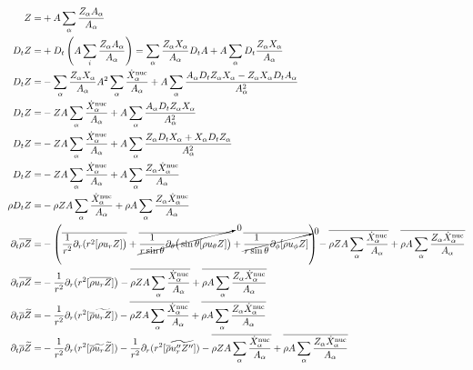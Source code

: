 \documentclass[10pt,paper=a4]{report}
\newcommand{\eht}{\overline}
\newcommand{\fht}{\widetilde}
\begin{document}
\begin{align}
Z = & + A \sum_\alpha \frac{Z_\alpha A_\alpha}{A_\alpha} \\
D_t Z = & +D_t \left(A \sum_i \frac{Z_\alpha A_\alpha}{A_\alpha}\right) = \sum_\alpha \frac{Z_\alpha X_\alpha}{A_\alpha} D_t A + A\sum_\alpha D_t \frac{Z_\alpha X_\alpha}{A_\alpha} \\
D_t Z = & -\sum_\alpha \frac{Z_\alpha X_\alpha}{A_\alpha}  A^2 \sum_\alpha \frac{\dot{X}_\alpha^{\rm nuc}}{A_\alpha} + A\sum_\alpha \frac{A_\alpha D_t Z_\alpha X_\alpha - Z_\alpha X_\alpha D_t A_\alpha}{A_\alpha^2} \\
D_t Z = & -Z A \sum_\alpha \frac{\dot{X}_\alpha^{\rm nuc}}{A_\alpha} + A \sum_\alpha \frac{A_\alpha D_t Z_\alpha X_\alpha}{A_\alpha^2} \\
D_t Z = & -Z A \sum_\alpha \frac{\dot{X}_\alpha^{\rm nuc}}{A_\alpha} + A\sum_\alpha \frac{Z_\alpha D_t X_\alpha + X_\alpha D_t Z_\alpha}{A^2_\alpha} \\
D_t Z = & -Z A \sum_\alpha \frac{\dot{X}_\alpha^{\rm nuc}}{A_\alpha} + A\sum_\alpha \frac{Z_\alpha \dot{X}_\alpha^{\rm nuc}}{A_\alpha} \\
\rho D_t Z = & -\rho Z A \sum_\alpha \frac{\dot{X}_\alpha^{\rm nuc}}{A_\alpha} + \rho A \sum_\alpha \frac{Z_\alpha \dot{X}_\alpha^{\rm nuc}}{A_\alpha} \\
\partial_t \overline{\rho Z} = & -\left( \eht{\frac{1}{r^{2}} \partial_{r}(r^{2} [\rho u_{r} Z ] \big)} + \cancelto{0}{\eht{\frac{1}{r\sin{\theta}}\partial_{\theta}\big(\sin{\theta} [\rho u_{\theta} Z ]\big)}} + \cancelto{0}{\eht{\frac{1}{r \sin{\theta}} \partial_{\phi} [\rho u_{\phi} Z]}} \right) -\eht{\rho Z A \sum_\alpha \frac{\dot{X}_\alpha^{\rm nuc}}{A_\alpha}} + \eht{\rho A \sum_\alpha \frac{Z_\alpha \dot{X}_\alpha^{\rm nuc}}{A_\alpha}}\\
\partial_t \overline{\rho Z} = & -\frac{1}{r^{2}} \partial_{r}(r^{2} [\eht{\rho u_{r} Z} ] \big) -\eht{\rho Z A \sum_\alpha \frac{\dot{X}_\alpha^{\rm nuc}}{A_\alpha}} + \eht{\rho A \sum_\alpha \frac{Z_\alpha \dot{X}_\alpha^{\rm nuc}}{A_\alpha}} \\
\partial_t \overline{\rho} \fht{Z} = & -\frac{1}{r^{2}} \partial_{r}(r^{2} [\eht{\rho} \fht{u_{r} Z}]) -\eht{\rho Z A \sum_\alpha \frac{\dot{X}_\alpha^{\rm nuc}}{A_\alpha}} + \eht{\rho A \sum_\alpha \frac{Z_\alpha \dot{X}_\alpha^{\rm nuc}}{A_\alpha}} \\
\partial_t \overline{\rho} \fht{Z} = & -\frac{1}{r^{2}} \partial_{r}(r^{2} [\eht{\rho} \fht{u_{r}} \fht{Z}]) -\frac{1}{r^{2}} \partial_{r}(r^{2} [\eht{\rho} \fht{u''_{r} Z''}]) -\eht{\rho Z A \sum_\alpha \frac{\dot{X}_\alpha^{\rm nuc}}{A_\alpha}} + \eht{\rho A \sum_\alpha \frac{Z_\alpha \dot{X}_\alpha^{\rm nuc}}{A_\alpha}} \\

\end{align}
\end{document}
